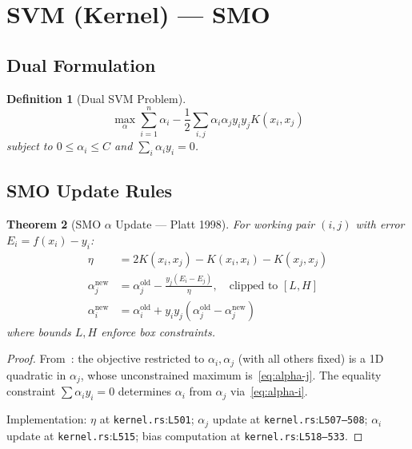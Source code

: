 \documentclass[11pt,a4paper]{article}
\newtheorem{theorem}{Theorem}[section]
\newtheorem{definition}[theorem]{Definition}
\theoremstyle{remark}
\newcommand{\coderef}[2]{\texttt{#1}:\texttt{L#2}}
\begin{document}
\section{SVM (Kernel) --- SMO}
\label{sec:svm}

\subsection{Dual Formulation}

\begin{definition}[Dual SVM Problem]
\begin{equation}
  \max_\alpha \sum_{i=1}^{n} \alpha_i
    - \frac{1}{2}\sum_{i,j} \alpha_i \alpha_j y_i y_j K(x_i, x_j)
  \label{eq:svm-dual}
\end{equation}
subject to $0 \leq \alpha_i \leq C$ and $\sum_i \alpha_i y_i = 0$.
\end{definition}

\subsection{SMO Update Rules}

\begin{theorem}[SMO $\alpha$ Update --- Platt 1998]
\label{thm:smo}
For working pair $(i, j)$ with error $E_i = f(x_i) - y_i$:
\begin{align}
  \eta &= 2K(x_i, x_j) - K(x_i, x_i) - K(x_j, x_j) \label{eq:eta}\\
  \alpha_j^{\text{new}} &= \alpha_j^{\text{old}}
    - \frac{y_j(E_i - E_j)}{\eta}, \quad
    \text{clipped to } [L, H] \label{eq:alpha-j}\\
  \alpha_i^{\text{new}} &= \alpha_i^{\text{old}}
    + y_i y_j(\alpha_j^{\text{old}} - \alpha_j^{\text{new}}) \label{eq:alpha-i}
\end{align}
where bounds $L, H$ enforce box constraints.
\end{theorem}

\begin{proof}
From~\cite{platt1998}: the objective restricted to $\alpha_i, \alpha_j$ (with
all others fixed) is a 1D quadratic in $\alpha_j$, whose unconstrained maximum
is~\eqref{eq:alpha-j}.  The equality constraint $\sum \alpha_i y_i = 0$
determines $\alpha_i$ from $\alpha_j$ via~\eqref{eq:alpha-i}.

Implementation: $\eta$ at \coderef{kernel.rs}{501}; $\alpha_j$ update at
\coderef{kernel.rs}{507--508}; $\alpha_i$ update at \coderef{kernel.rs}{515};
bias computation at \coderef{kernel.rs}{518--533}. \checkmark
\end{proof}
\end{document}

